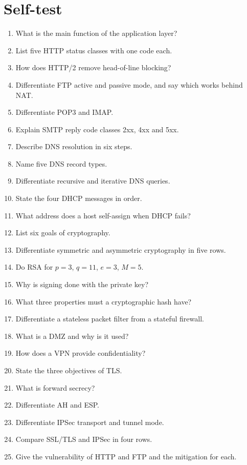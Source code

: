 \documentclass[11pt,a4paper]{article}
\begin{document}
\section{Self-test}

\begin{enumerate}
\item What is the main function of the application layer?
\item List five HTTP status classes with one code each.
\item How does HTTP/2 remove head-of-line blocking?
\item Differentiate FTP active and passive mode, and say which works behind NAT.
\item Differentiate POP3 and IMAP.
\item Explain SMTP reply code classes 2xx, 4xx and 5xx.
\item Describe DNS resolution in six steps.
\item Name five DNS record types.
\item Differentiate recursive and iterative DNS queries.
\item State the four DHCP messages in order.
\item What address does a host self-assign when DHCP fails?
\item List six goals of cryptography.
\item Differentiate symmetric and asymmetric cryptography in five rows.
\item Do RSA for $p = 3$, $q = 11$, $e = 3$, $M = 5$.
\item Why is signing done with the private key?
\item What three properties must a cryptographic hash have?
\item Differentiate a stateless packet filter from a stateful firewall.
\item What is a DMZ and why is it used?
\item How does a VPN provide confidentiality?
\item State the three objectives of TLS.
\item What is forward secrecy?
\item Differentiate AH and ESP.
\item Differentiate IPSec transport and tunnel mode.
\item Compare SSL/TLS and IPSec in four rows.
\item Give the vulnerability of HTTP and FTP and the mitigation for each.
\end{enumerate}
\end{document}
